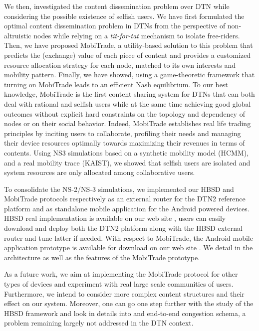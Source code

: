 We then, investigated the content dissemination problem over DTN while considering the possible existence of selfish users. We have first formulated the optimal content dissemination problem in DTNs from the perspective of non-altruistic nodes while relying on a \emph{tit-for-tat} mechanism to isolate free-riders. Then, we have proposed MobiTrade, a utility-based solution to this problem that predicts the (exchange) value of each piece of content and provides a customized resource allocation strategy for each node, matched to its own interests and mobility pattern. Finally, we have showed, using a game-theoretic framework that turning on MobiTrade leads to an efficient Nash equilibrium. To our best knowledge, MobiTrade is the first content sharing
system for DTNs that can both deal with rational and selfish users while at the same time achieving good global outcomes
without explicit hard constraints on the topology and dependency of nodes or on their social behavior. Indeed, MobiTrade establishes real life trading principles by inciting users to collaborate, profiling their needs and managing their device resources optimally towards maximizing their revenues in terms of contents. Using NS3 simulations based on a synthetic mobility model (HCMM), and a real mobility trace (KAIST), we showed that selfish users are isolated and system resources are only allocated among collaborative users. 

To consolidate the NS-2/NS-3 simulations, we implemented our HBSD and MobiTrade protocols respectively as an external router for the DTN2 reference platform and as standalone mobile application for the Android powered devices. HBSD real implementation is available on our web site \cite{HBSDDTN2}, users can easily download and deploy both the DTN2 platform along with the HBSD external router and tune latter if needed. With respect to MobiTrade, the Android mobile application prototype is available for download on our web site \cite{MobiTradeAndroid}. We detail in \cite{MobiTradeAndroid} the architecture as well as the features of the MobiTrade prototype. 

As a future work, we aim at implementing the MobiTrade protocol for other types of devices and experiment with real large scale communities of users. Furthermore, we intend to consider more complex content structures and their effect on our system. Moreover, one can go one step further with the study of the HBSD framework and look in details into and end-to-end congestion schema, a problem remaining largely not addressed in the DTN context. 

